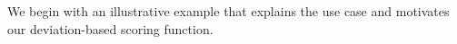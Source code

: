 We begin with an illustrative example that explains the \SeeDB use case and motivates our deviation-based
scoring function. 






